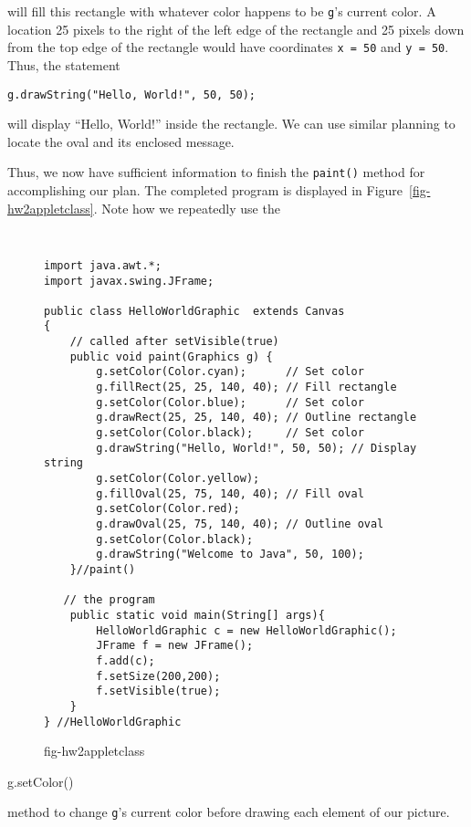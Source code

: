 \noindent will fill this rectangle with whatever color happens to
be {\tt g}'s current color.  A location 25 pixels to the right of the
left edge of the rectangle and 25 pixels down from the top 
edge of the rectangle would have coordinates \mbox{\tt x = 50} and
\mbox{\tt y = 50}.  Thus, the statement

\begin{jjjlisting}
\begin{lstlisting}
g.drawString("Hello, World!", 50, 50);
\end{lstlisting}
\end{jjjlisting}

\noindent will display ``Hello, World!'' inside the rectangle. We can
use similar planning to locate the oval and its enclosed message.

Thus, we now have sufficient information to finish the {\tt paint()}
method for accomplishing our plan.  The completed program is displayed
in Figure~\ref{fig-hw2appletclass}. Note how we repeatedly use the {\tt
\begin{figure}[!htb]
\jjjprogstart
\begin{jjjlisting}
\begin{lstlisting}
import java.awt.*;
import javax.swing.JFrame;

public class HelloWorldGraphic  extends Canvas 
{ 
    // called after setVisible(true)
    public void paint(Graphics g) { 
        g.setColor(Color.cyan);      // Set color
        g.fillRect(25, 25, 140, 40); // Fill rectangle
        g.setColor(Color.blue);      // Set color
        g.drawRect(25, 25, 140, 40); // Outline rectangle
        g.setColor(Color.black);     // Set color
        g.drawString("Hello, World!", 50, 50); // Display string
        g.setColor(Color.yellow);          
        g.fillOval(25, 75, 140, 40); // Fill oval
        g.setColor(Color.red);
        g.drawOval(25, 75, 140, 40); // Outline oval
        g.setColor(Color.black);
        g.drawString("Welcome to Java", 50, 100);
    }//paint()

   // the program
    public static void main(String[] args){
        HelloWorldGraphic c = new HelloWorldGraphic();
        JFrame f = new JFrame();
        f.add(c);
        f.setSize(200,200);
        f.setVisible(true);
    }
} //HelloWorldGraphic
\end{lstlisting}
\end{jjjlisting}
{fig-hw2appletclass}
\end{figure}
g.setColor()} method to change {\tt g}'s current color before drawing
each element of our picture. 

